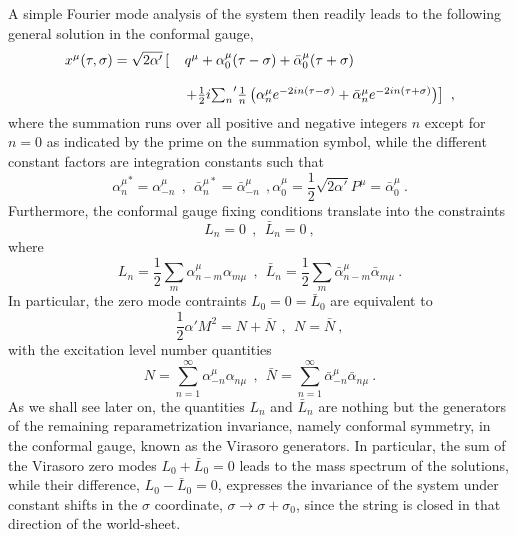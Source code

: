 \documentclass[a4paper,11pt]{article}
\begin{document}
A simple Fourier mode analysis of the system then readily leads to the
following general solution in the conformal gauge,
\begin{equation}
\begin{array}{r l}
x^\mu(\tau,\sigma)=\sqrt{2\alpha'}\left[\right.&
q^\mu+\alpha^\mu_0(\tau-\sigma)+\bar{\alpha}^\mu_0(\tau+\sigma)\\
 & \\
 &\left. + \frac{1}{2}i{\sum_n}'\frac{1}{n}\left(\alpha^\mu_n 
e^{-2in(\tau-\sigma)}+\bar{\alpha}^\mu_ne^{-2in(\tau+\sigma)}\right)\right]\ ,
\end{array}
\end{equation}
where the summation runs over all positive and negative integers $n$
except for $n=0$ as indicated by the prime on the summation symbol, while
the different constant factors are integration constants such that
\begin{equation}
{\alpha^\mu_n}^*=\alpha^\mu_{-n}\ \ ,\ \ 
{\bar{\alpha}^{\mu*}_n}=\bar{\alpha}^\mu_{-n}\ \ ,
\alpha^\mu_0=\frac{1}{2}\sqrt{2\alpha'}P^\mu=\bar{\alpha}^\mu_0\ .
\end{equation}
Furthermore, the conformal gauge fixing conditions translate into the
constraints
\begin{equation}
L_n=0\ \ ,\ \ \bar{L}_n=0\ ,
\end{equation}
where
\begin{equation}
L_n=\frac{1}{2}\sum_m\alpha^\mu_{n-m}\alpha_{m\mu}\ \ ,\ \ 
\bar{L}_n=\frac{1}{2}\sum_m\bar{\alpha}^\mu_{n-m}\bar{\alpha}_{m\mu}\ .
\end{equation}
In particular, the zero mode contraints $L_0=0=\bar{L}_0$ are equivalent to
\begin{equation}
\frac{1}{2}\alpha' M^2=N+\bar{N}\ \ ,\ \ N=\bar{N}\ ,
\end{equation}
with the excitation level number quantities
\begin{equation}
N=\sum_{n=1}^\infty \alpha^\mu_{-n}\alpha_{n\mu}\ \ ,\ \ 
\bar{N}=\sum_{n=1}^\infty\bar{\alpha}^\mu_{-n}\bar{\alpha}_{n\mu}\ .
\end{equation}
As we shall see later on, the quantities $L_n$ and $\bar{L}_n$ are nothing 
but the generators of the remaining reparametrization invariance, namely 
conformal symmetry, in the conformal gauge, known as the Virasoro generators. 
In particular, the sum of the Virasoro zero modes $L_0+\bar{L}_0=0$ leads 
to the mass spectrum of the solutions, while their difference, 
$L_0-\bar{L}_0=0$, expresses the invariance of the system under constant 
shifts in the $\sigma$ coordinate, $\sigma\rightarrow\sigma+\sigma_0$, since 
the string is closed in that direction of the world-sheet.
\end{document}
